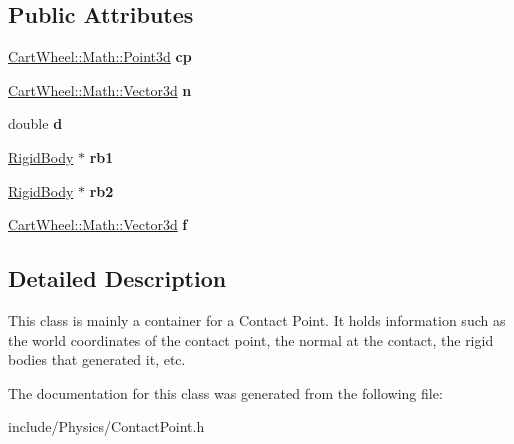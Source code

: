 \subsection*{Public Attributes}
\begin{DoxyCompactItemize}
\item 
\hypertarget{classCartWheel_1_1Physics_1_1ContactPoint_a95f78903538c8578e2ef6af4d29ae26b}{
\hyperlink{classCartWheel_1_1Math_1_1Point3d}{CartWheel::Math::Point3d} {\bfseries cp}}
\label{classCartWheel_1_1Physics_1_1ContactPoint_a95f78903538c8578e2ef6af4d29ae26b}

\item 
\hypertarget{classCartWheel_1_1Physics_1_1ContactPoint_ac699334b2be4b43a94be1f63353f8c68}{
\hyperlink{classCartWheel_1_1Math_1_1Vector3d}{CartWheel::Math::Vector3d} {\bfseries n}}
\label{classCartWheel_1_1Physics_1_1ContactPoint_ac699334b2be4b43a94be1f63353f8c68}

\item 
\hypertarget{classCartWheel_1_1Physics_1_1ContactPoint_a1923ba01a2a577e4dc8eb0ea1b14907a}{
double {\bfseries d}}
\label{classCartWheel_1_1Physics_1_1ContactPoint_a1923ba01a2a577e4dc8eb0ea1b14907a}

\item 
\hypertarget{classCartWheel_1_1Physics_1_1ContactPoint_ad81c8778e337f7563c452878451b7382}{
\hyperlink{classCartWheel_1_1Physics_1_1RigidBody}{RigidBody} $\ast$ {\bfseries rb1}}
\label{classCartWheel_1_1Physics_1_1ContactPoint_ad81c8778e337f7563c452878451b7382}

\item 
\hypertarget{classCartWheel_1_1Physics_1_1ContactPoint_a9741a5605c456330e0451f01287d2984}{
\hyperlink{classCartWheel_1_1Physics_1_1RigidBody}{RigidBody} $\ast$ {\bfseries rb2}}
\label{classCartWheel_1_1Physics_1_1ContactPoint_a9741a5605c456330e0451f01287d2984}

\item 
\hypertarget{classCartWheel_1_1Physics_1_1ContactPoint_a7a400b36220b451127555a7168ce8e87}{
\hyperlink{classCartWheel_1_1Math_1_1Vector3d}{CartWheel::Math::Vector3d} {\bfseries f}}
\label{classCartWheel_1_1Physics_1_1ContactPoint_a7a400b36220b451127555a7168ce8e87}

\end{DoxyCompactItemize}


\subsection{Detailed Description}
This class is mainly a container for a Contact Point. It holds information such as the world coordinates of the contact point, the normal at the contact, the rigid bodies that generated it, etc. 

The documentation for this class was generated from the following file:\begin{DoxyCompactItemize}
\item 
include/Physics/ContactPoint.h\end{DoxyCompactItemize}

